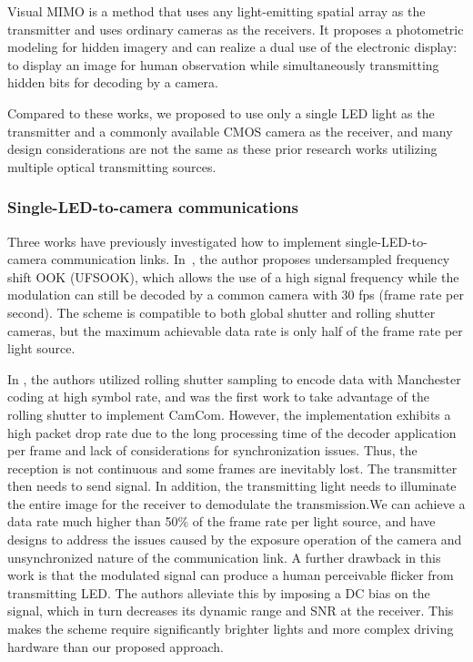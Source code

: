 Visual MIMO \cite{visualmimo1, visualmimo2, visualmimo3} is a method that uses any light-emitting spatial array as the transmitter and uses ordinary cameras as the receivers.
It proposes a photometric modeling for hidden imagery and can realize a dual use of the electronic display: to display an image for human observation while simultaneously transmitting hidden bits for decoding by a camera.

Compared to these works, we proposed to use only a single LED light as the transmitter and a commonly available CMOS camera as the receiver, and many design considerations are not the same as these prior research works utilizing multiple optical transmitting sources.


\subsubsection{Single-LED-to-camera communications}
Three works \cite{roberts2013undersampled, danakis2012using,landmark} have previously investigated how to implement single-LED-to-camera communication links. 
In~\cite{roberts2013undersampled}, the author proposes undersampled frequency shift OOK (UFSOOK), which allows the use of a high signal frequency while the modulation can still be decoded by a common camera with 30 fps (frame rate per second). The scheme is compatible to both global shutter and rolling shutter cameras, but the maximum achievable data rate is only half of the frame rate per light source.

In \cite{danakis2012using}, the authors utilized rolling shutter sampling to encode data with Manchester coding at high symbol rate, and was the first work to take advantage of the rolling shutter to implement CamCom. 
However, the implementation exhibits a high packet drop rate due to the long processing time of the decoder application per frame and lack of considerations for synchronization issues. Thus, the reception is not continuous and some frames are inevitably lost. The transmitter then needs to send signal.
In addition, the transmitting light needs to illuminate the entire image for the receiver to demodulate the transmission.We can achieve a data rate much higher than 50\% of the frame rate per light source, and have designs to address the issues caused by the exposure operation of the camera and unsynchronized nature of the communication link.
A further drawback in this work is that the modulated signal can produce a human perceivable flicker from transmitting LED. The authors alleviate this by imposing a DC bias on the signal, which in turn decreases its dynamic range and SNR at the receiver. This makes the scheme require significantly brighter lights and more complex driving hardware than our proposed approach.

